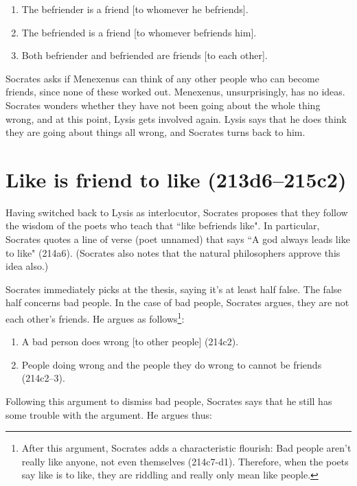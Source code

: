 \documentclass[11pt]{article}
\begin{document}
\begin{enumerate}
    \item The befriender is a friend [to whomever he befriends].
    \item The befriended is a friend [to whomever befriends him].
    \item Both befriender and befriended are friends [to each other].
\end{enumerate}

Socrates asks if Menexenus can think of any other people who can become friends, since none of these worked out.  Menexenus, unsurprisingly, has no ideas.  Socrates wonders whether they have not been going about the whole thing wrong, and at this point, Lysis gets involved again.  Lysis says that he does think they are going about things all wrong, and Socrates turns back to him.

\section{Like is friend to like (213d6--215c2)}

Having switched back to Lysis as interlocutor, Socrates proposes that they follow the wisdom of the poets who teach that ``like befriends like".  In particular, Socrates quotes a line of verse (poet unnamed) that says ``A god always leads like to like" (214a6).  (Socrates also notes that the natural philosophers approve this idea also.)

Socrates immediately picks at the thesis, saying it's at least half false.  The false half concerns bad people.  In the case of bad people, Socrates argues, they are not each other's friends.  He argues as follows\footnote{After this argument, Socrates adds a characteristic flourish: Bad people aren't really like anyone, not even themselves (214c7-d1).  Therefore, when the poets say like is to like, they are riddling and really only mean  like people.}:

\begin{enumerate}
    \item A bad person does wrong [to other people] (214c2).
    \item People doing wrong and the people they do wrong to cannot be friends (214c2--3).
\end{enumerate}

Following this argument to dismiss bad people, Socrates says that he still has some trouble with the argument.  He argues thus:
\end{document}
